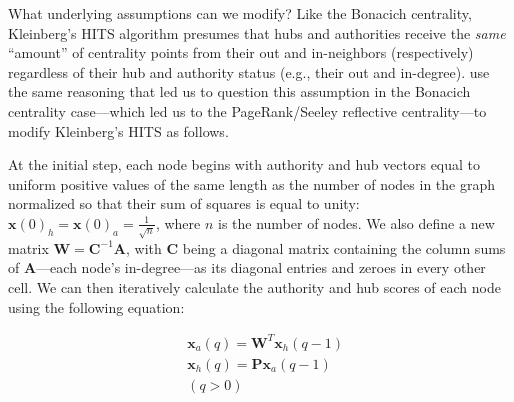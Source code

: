 \documentclass[a4paper,fleqn]{cas-sc}
\begin{document}
What underlying assumptions can we modify? Like the Bonacich centrality, Kleinberg's HITS algorithm presumes that hubs and authorities receive the \textit{same} ``amount'' of centrality points from their out and in-neighbors (respectively) regardless of their hub and authority status (e.g., their out and in-degree). \citet{lempel_moran01} use the same reasoning that led us to question this assumption in the Bonacich centrality case---which led us to the PageRank/Seeley reflective centrality---to modify Kleinberg's HITS as follows.


At the initial step, each node begins with authority and hub vectors equal to uniform positive values of the same length as the number of nodes in the graph normalized so that their sum of squares is equal to unity: $\mathbf{x}(0)_h = \mathbf{x}(0)_a = \frac{1}{\sqrt{n}}$, where $n$ is the number of nodes. We also define a new matrix $\mathbf{W}=\mathbf{C}^{-1} \mathbf{A}$, with $\mathbf{C}$ being a diagonal matrix containing the column sums of $\mathbf{A}$---each node's in-degree---as its diagonal entries and zeroes in every other cell. We can then iteratively calculate the authority and hub scores of each node using the following equation:

\begin{equation}
    \begin{split}
        &\mathbf{x}_a(q) = \mathbf{W}^T\mathbf{x}_h(q-1) \\
        &\mathbf{x}_h(q) = \mathbf{P}\mathbf{x}_a(q-1) \\
        &(q > 0)
    \end{split}
    \label{eq:salsa}
\end{equation}
\end{document}
